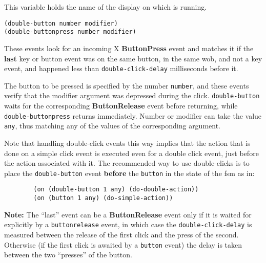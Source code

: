         

This variable holds the name of the display on which {\GWM} is running.

        
{\usagefont\begin{verbatim}
(double-button number modifier)
(double-buttonpress number modifier)
\end{verbatim}}\usageupspace

These events look for an incoming X {\bf ButtonPress} event and matches it
if the {\bf last} key or button event was on the same button, in the same
wob, and not a key event, and happened less than \verb"double-click-delay"
milliseconds before it.

The button to be pressed is specified by the number \verb"number", and these
events verify that the modifier argument was depressed during the click.
\verb"double-button" waits for the corresponding {\bf ButtonRelease}
event before returning, while \verb"double-buttonpress" returns
immediately.  Number or modifier can take the value \verb"any", thus
matching any of the values of the corresponding argument.  

Note that handling double-click events this way implies that the action that
is done on a simple click event is executed even for a double click event,
just before the action associated with it. The recommended way to use
double-clicks is to place the \verb"double-button" event {\bf before} the
\verb"button" in the state of the fsm as in:

{\exemplefont\begin{verbatim}
        (on (double-button 1 any) (do-double-action))
        (on (button 1 any) (do-simple-action))
\end{verbatim}}

{\bf Note:} The ``last'' event can be a {\bf ButtonRelease} event only if it
is waited for explicitly by a {\GWM} \verb"buttonrelease" event, in which
case the \verb"double-click-delay" is measured between the release of the
first click and the press of the second. Otherwise (if the first click is
awaited by a \verb"button" event) the delay is taken between the two
``presses'' of the button.



